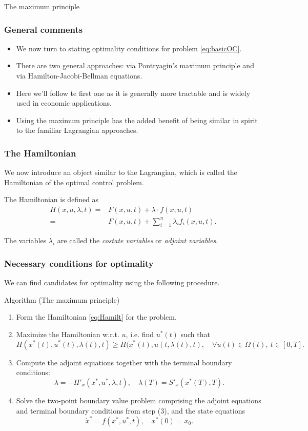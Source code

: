 \documentclass[10pt]{beamer}
\theoremstyle{definition}
\begin{document}
\begin{section}{The maximum principle}\label{sec:max}

\begin{frame}[fragile]
\frametitle{General comments}
\begin{itemize}\itemsep1em
\item We now turn to stating optimality conditions for problem \eqref{eq:basicOC}.
\item There are two general approaches: via Pontryagin's maximum principle and via Hamilton-Jacobi-Bellman equations.
\item Here we'll follow te first one as it is generally more tractable and is widely used in economic applications.
\item Using the maximum principle has the added benefit of being similar in spirit to the familiar Lagrangian approaches. 
\end{itemize}
\end{frame}

\begin{frame}[fragile]
\frametitle{The Hamiltonian}

We now introduce an object similar to the Lagrangian, which is called the Hamiltonian of the optimal control problem.\bigskip

The Hamiltonian is defined as
\begin{equation}
\begin{split}
H(x,u,\lambda,t) =& F(x,u,t)+\lambda \cdot f(x,u,t) \\
=&  F(x,u,t)+\sum_{i=1}^{n}\lambda_i f_i(x,u,t).
\end{split}
\label{eq:Hamilt}
\end{equation}\bigskip

The variables $ \lambda_i $ are called the \emph{costate variables} or \emph{adjoint variables}.
\end{frame}

\begin{frame}[fragile]
\frametitle{Necessary conditions for optimality}
We can find candidates for optimality using the following procedure.

\begin{block}{Algorithm (The maximum principle)}
\begin{enumerate}
\item Form the Hamiltonian \eqref{eq:Hamilt} for the problem.
\item Maximize the Hamiltonian w.r.t. $ u $, i.e. find $ u^*(t) $ such that
\[ H(x^*(t),u^*(t),\lambda(t),t)\geq  H(x^*(t),u(t,\lambda(t),t),\quad \forall u(t)\in \Omega(t),~t \in[0,T]. \]
\item Compute the adjoint equations together with the terminal boundary conditions:
\[ \dot{\lambda} = -H'_x(x^*,u^*,\lambda,t),\quad \lambda(T)=S'_x(x^*(T),T).  \]
\item Solve the two-point boundary value problem comprising the adjoint equations and terminal boundary conditions from step (3), and the state equations \[ \dot{x}^* = f(x^*,u^*,t), \quad x^*(0)=x_0. \]
\end{enumerate}
\end{block}
\end{frame}


\end{section}
\end{document}
